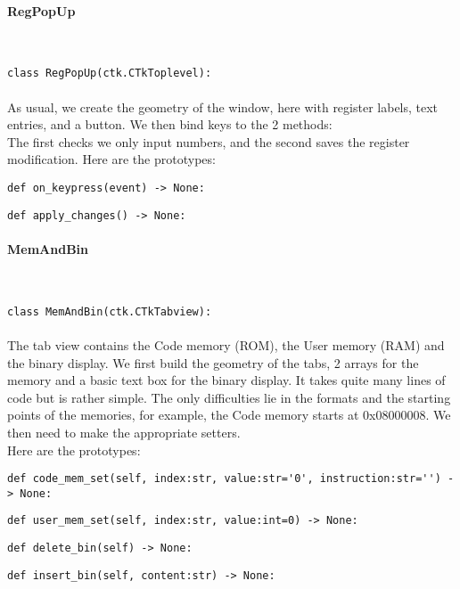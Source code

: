 \documentclass{article}
\newcommand{\subsubsubsection}[1]{\paragraph{#1}\mbox{}\\}
\begin{document}
\newpage
\subsubsubsection{RegPopUp}
\begin{lstlisting}[language=MyPython]
class RegPopUp(ctk.CTkToplevel):
\end{lstlisting}
\paragraph{}

As usual, we create the geometry of the window, here with register labels, text entries, and a button. We then bind keys to the 2 methods: \\
The first checks we only input numbers, and the second saves the register modification. Here are the prototypes: \\

\begin{lstlisting}[language=MyPython]
def on_keypress(event) -> None:
\end{lstlisting}
\begin{lstlisting}[language=MyPython]
def apply_changes() -> None:
\end{lstlisting}
\paragraph{}
\subsubsubsection{MemAndBin}
\begin{lstlisting}[language=MyPython]
class MemAndBin(ctk.CTkTabview):
\end{lstlisting}
\paragraph{}

The tab view contains the Code memory (ROM), the User memory (RAM) and the binary display. We first build the geometry of the tabs, 2 arrays for the memory and a basic text box for the binary display. It takes quite many lines of code but is rather simple. The only difficulties lie in the formats and the starting points of the memories, for example, the Code memory starts at 0x08000008. We then need to make the appropriate setters. \\
Here are the prototypes: \\

\begin{lstlisting}[language=MyPython]
def code_mem_set(self, index:str, value:str='0', instruction:str='') -> None:
\end{lstlisting}
\begin{lstlisting}[language=MyPython]
def user_mem_set(self, index:str, value:int=0) -> None:
\end{lstlisting}
\begin{lstlisting}[language=MyPython]
def delete_bin(self) -> None:
\end{lstlisting}
\begin{lstlisting}[language=MyPython]
def insert_bin(self, content:str) -> None:
\end{lstlisting}
\end{document}
